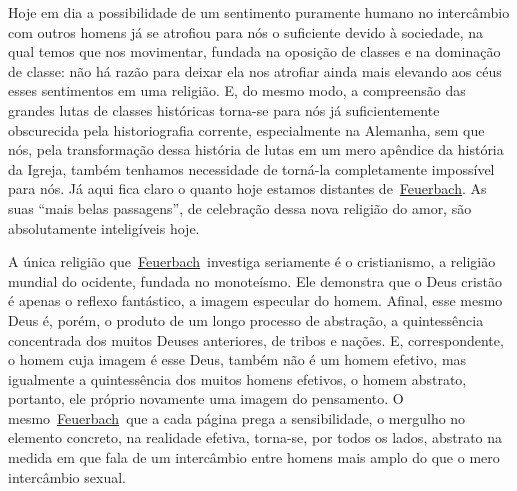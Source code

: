 Hoje em dia a possibilidade de um sentimento puramente humano no
intercâmbio com outros homens já se atrofiou para nós o suficiente
devido à sociedade, na qual temos que nos movimentar, fundada na
oposição de classes e na dominação de classe: não há razão para deixar
ela nos atrofiar ainda mais elevando aos céus esses sentimentos em uma
religião. E, do mesmo modo, a compreensão das grandes lutas de classes
históricas torna-se para nós já suficientemente obscurecida pela
historiografia corrente, especialmente na Alemanha, sem que nós, pela
transformação dessa história de lutas em um mero apêndice da história da
Igreja, também tenhamos necessidade de torná-la completamente impossível
para nós. Já aqui fica claro o quanto hoje estamos distantes
de~\href{https://www.marxists.org/portugues/dicionario/verbetes/f/feuerbach.htm}{Feuerbach}.
As suas ``mais belas passagens'', de celebração dessa nova religião do
amor, são absolutamente inteligíveis hoje.

A única religião
que~\href{https://www.marxists.org/portugues/dicionario/verbetes/f/feuerbach.htm}{Feuerbach}~investiga
seriamente é o cristianismo, a religião mundial do ocidente, fundada no
monoteísmo. Ele demonstra que o Deus cristão é apenas o reflexo
fantástico, a imagem especular do homem. Afinal, esse mesmo Deus é,
porém, o produto de um longo processo de abstração, a quintessência
concentrada dos muitos Deuses anteriores, de tribos e nações. E,
correspondente, o homem cuja imagem é esse Deus, também não é um homem
efetivo, mas igualmente a quintessência dos muitos homens efetivos, o
homem abstrato, portanto, ele próprio novamente uma imagem do
pensamento. O
mesmo~\href{https://www.marxists.org/portugues/dicionario/verbetes/f/feuerbach.htm}{Feuerbach}~que
a cada página prega a sensibilidade, o mergulho no elemento concreto, na
realidade efetiva, torna-se, por todos os lados, abstrato na medida em
que fala de um intercâmbio entre homens mais amplo do que o mero
intercâmbio sexual.

